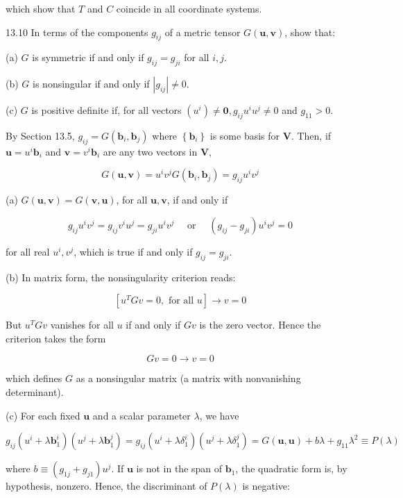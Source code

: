 \documentclass[10pt]{article}
\begin{document}
which show that $T$ and $C$ coincide in all coordinate systems.

13.10 In terms of the components $g_{i j}$ of a metric tensor $G(\mathbf{u}, \mathbf{v})$, show that:

(a) $G$ is symmetric if and only if $g_{i j}=g_{j i}$ for all $i, j$.

(b) $G$ is nonsingular if and only if $\left|g_{i j}\right| \neq 0$.

(c) $G$ is positive definite if, for all vectors $\left(u^{i}\right) \neq \mathbf{0}, g_{i j} u^{i} u^{j} \neq 0$ and $g_{11}>0$.

By Section 13.5, $g_{i j}=G\left(\mathbf{b}_{i}, \mathbf{b}_{j}\right)$ where $\left\{\mathbf{b}_{i}\right\}$ is some basis for $\mathbf{V}$. Then, if $\mathbf{u}=u^{i} \mathbf{b}_{i}$ and $\mathbf{v}=v^{i} \mathbf{b}_{i}$ are any two vectors in $\mathbf{V}$,

$$
G(\mathbf{u}, \mathbf{v})=u^{i} v^{j} G\left(\mathbf{b}_{i}, \mathbf{b}_{j}\right)=g_{i j} u^{i} v^{j}
$$

(a) $G(\mathbf{u}, \mathbf{v})=G(\mathbf{v}, \mathbf{u})$, for all $\mathbf{u}, \mathbf{v}$, if and only if

$$
g_{i j} u^{i} v^{j}=g_{i j} v^{i} u^{j}=g_{j i} u^{i} v^{j} \quad \text { or } \quad\left(g_{i j}-g_{j i}\right) u^{i} v^{j}=0
$$

for all real $u^{i}, v^{j}$, which is true if and only if $g_{i j}=g_{j i}$.

(b) In matrix form, the nonsingularity criterion reads:

$$
\left[u^{T} G v=0, \text { for all } u\right] \rightarrow v=0
$$

But $u^{T} G v$ vanishes for all $u$ if and only if $G v$ is the zero vector. Hence the criterion takes the form

$$
G v=0 \rightarrow v=0
$$

which defines $G$ as a nonsingular matrix (a matrix with nonvanishing determinant).

(c) For each fixed $\mathbf{u}$ and a scalar parameter $\lambda$, we have

$$
g_{i j}\left(u^{i}+\lambda \mathbf{b}_{1}^{i}\right)\left(u^{j}+\lambda \mathbf{b}_{1}^{j}\right)=g_{i j}\left(u^{i}+\lambda \delta_{1}^{i}\right)\left(u^{j}+\lambda \delta_{1}^{j}\right)=G(\mathbf{u}, \mathbf{u})+b \lambda+g_{11} \lambda^{2} \equiv P(\lambda)
$$

where $b \equiv\left(g_{1 j}+g_{j 1}\right) u^{j}$. If $\mathbf{u}$ is not in the span of $\mathbf{b}_{1}$, the quadratic form is, by hypothesis, nonzero. Hence, the discriminant of $P(\lambda)$ is negative:
\end{document}
